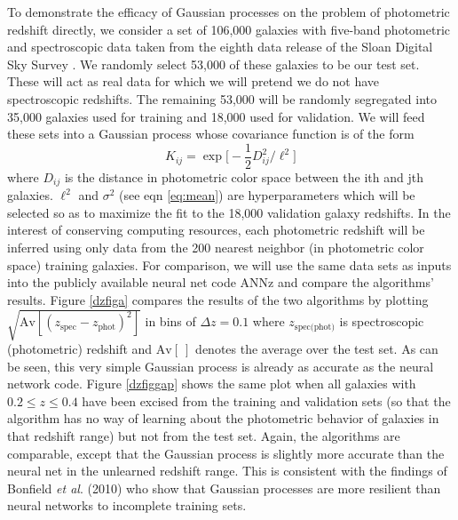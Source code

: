 \documentclass[prd, nofootinbib, floatfix, 12pt,tightenlines]{revtex4}
\begin{document}
To demonstrate the efficacy of Gaussian processes on the problem of
photometric redshift directly, we consider a set of 106,000 galaxies with
five-band photometric and spectroscopic data taken from the eighth data
release of the Sloan Digital Sky Survey \cite{Abazajian:2008wr}.  We
randomly select 53,000 of these galaxies to be our test set.  These will
act as real data for which we will pretend we do not have spectroscopic
redshifts.  The remaining 53,000 will be randomly segregated into 35,000
galaxies used for training and 18,000 used for validation.  We will feed
these sets into a Gaussian process whose covariance function is of the form
\begin{equation}
\label{testcovar}
K_{ij}=\exp\bigg[-\frac{1}{2}D^2_{ij}/\ell^2\bigg]
\end{equation}
where $D_{ij}$ is the distance in photometric color space between the ith
and jth galaxies.  $\ell^2$ and $\sigma^2$ (see eqn \ref{eq:mean}) are
hyperparameters which will be selected so as to maximize the fit to the
18,000 validation galaxy redshifts.  In the interest of conserving
computing resources, each photometric redshift will be inferred using only
data from the 200 nearest neighbor (in photometric color space) training
galaxies.  For comparison, we will use the same data sets as inputs into
the publicly available neural net code ANNz \cite{annz} and compare the
algorithms' results.  Figure \ref{dzfiga} compares the results of the two
algorithms by plotting $\sqrt{\text{Av}[(z_\text{spec}-z_\text{phot})^2]}$ in bins
of $\Delta z=0.1$ where $z_\text{spec(phot)}$ is spectroscopic
(photometric) redshift and $\text{Av}[~]$ denotes the average over the test set.
As can be seen, this very simple Gaussian process is already as accurate as
the neural network code.  Figure \ref{dzfiggap} shows the same plot when
all galaxies with $0.2\le z\le0.4$ have been excised from the training and
validation sets (so that the algorithm has no way of learning about the
photometric behavior of galaxies in that redshift range) but not from the
test set.  Again, the algorithms are comparable, except that the Gaussian
process is slightly more accurate than the neural net in the unlearned
redshift range.  This is consistent with the findings of Bonfield {\it et
  al}. (2010) who show that Gaussian processes are more resilient than
neural networks to incomplete training sets.
\end{document}
